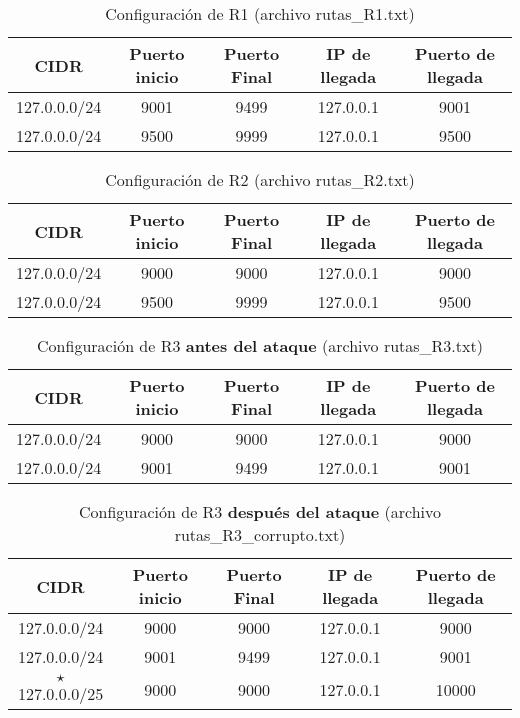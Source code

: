 \documentclass{article}
\begin{document}
\begin{table}[H]
\centering
\caption{Configuración de R1 (archivo rutas\_R1.txt)}
\begin{tabular}[t]{ccccc}
\hline
CIDR&Puerto inicio&Puerto Final&IP de llegada&Puerto de llegada\\
\hline
127.0.0.0/24 & 9001 & 9499 & 127.0.0.1 & 9001 \\
127.0.0.0/24 & 9500 & 9999 & 127.0.0.1 & 9500 \\
\hline
\end{tabular}
\end{table}

\begin{table}[H]
\centering
\caption{Configuración de R2 (archivo rutas\_R2.txt)}
\begin{tabular}[t]{ccccc}
\hline
CIDR&Puerto inicio&Puerto Final&IP de llegada&Puerto de llegada\\
\hline
127.0.0.0/24 & 9000 & 9000 & 127.0.0.1 & 9000 \\
127.0.0.0/24 & 9500 & 9999 & 127.0.0.1 & 9500 \\
\hline
\end{tabular}
\end{table}

\begin{table}[H]
\centering
\caption{Configuración de R3 \textbf{antes del ataque} (archivo rutas\_R3.txt)}
\begin{tabular}[t]{ccccc}
\hline
CIDR&Puerto inicio&Puerto Final&IP de llegada&Puerto de llegada\\
\hline
127.0.0.0/24 & 9000 & 9000 & 127.0.0.1 & 9000 \\
127.0.0.0/24 & 9001 & 9499 & 127.0.0.1 & 9001 \\
\hline
\end{tabular}
\end{table}

\begin{table}[H]
\centering
\caption{Configuración de R3 \textbf{después del ataque} (archivo rutas\_R3\_corrupto.txt)}
\begin{tabular}[t]{ccccc}
\hline
CIDR&Puerto inicio&Puerto Final&IP de llegada&Puerto de llegada\\
\hline
127.0.0.0/24 & 9000 & 9000 & 127.0.0.1 & 9000 \\
127.0.0.0/24 & 9001 & 9499 & 127.0.0.1 & 9001 \\
$\star$127.0.0.0/25 & 9000 & 9000 & 127.0.0.1 & 10000 \\
\hline
\end{tabular}
\end{table}
\end{document}
